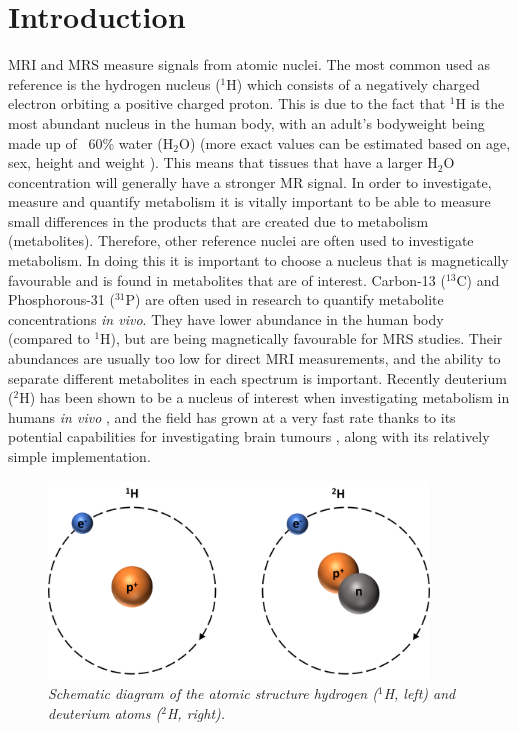 \chapter{Introduction}
\label{Chap:Introduction}

\Ac{MRI} and \ac{MRS} measure signals from atomic nuclei. The most common used as reference is the hydrogen nucleus ($^1$H) which consists of a negatively charged electron orbiting a positive charged proton. This is due to the fact that $^1$H is the most abundant nucleus in the human body, with an adult's bodyweight being made up of ~60\% water (H$_2$O) (more exact values can be estimated based on age, sex, height and weight \cite{Watson1980TotalMeasurements}). This means that tissues that have a larger H$_2$O concentration will generally have a stronger MR signal. In order to investigate, measure and quantify metabolism it is vitally important to be able to measure small differences in the products that are created due to metabolism (metabolites). Therefore, other reference nuclei are often used to investigate metabolism. In doing this it is important to choose a nucleus that is magnetically favourable and is found in metabolites that are of interest. Carbon-13 ($^{13}$C) \cite{Grist2019QuantifyingImaging,Brender2019DynamicHyperpolarization} and Phosphorous-31 ($^{31}$P) \cite{Gordon1980LocalizationResonance} are often used in research to quantify metabolite concentrations \textit{in vivo}. They have lower abundance in the human body (compared to $^1$H), but are being magnetically favourable for MRS studies. Their abundances are usually too low for direct \ac{MRI} measurements, and the ability to separate different metabolites in each spectrum is important. Recently deuterium ($^2$H) has been shown to be a nucleus of interest when investigating metabolism in humans \textit{in vivo} \cite{Lu2017QuantitativeSpectroscopy,DeFeyter2018DeuteriumVivo}, and the field has grown at a very fast rate thanks to its potential capabilities for investigating brain tumours \cite{DeFeyter2018DeuteriumVivo}, along with its relatively simple implementation.

\begin{figure}
    \centering
    \includegraphics[width=0.9\textwidth]{Figures/Intro/1H2H.png}
    \caption{\textit{Schematic diagram of the atomic structure hydrogen ($^1$H, left) and deuterium atoms ($^2$H, right).}}
    \label{fig:intro:1H2H}
\end{figure}

